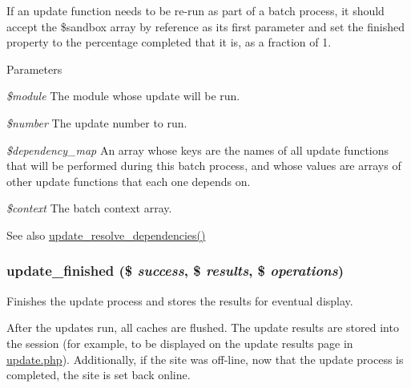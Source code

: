 If an update function needs to be re-\/run as part of a batch process, it should accept the \$sandbox array by reference as its first parameter and set the finished property to the percentage completed that it is, as a fraction of 1.


\begin{DoxyParams}{Parameters}
\item[{\em \$module}]The module whose update will be run. \item[{\em \$number}]The update number to run. \item[{\em \$dependency\_\-map}]An array whose keys are the names of all update functions that will be performed during this batch process, and whose values are arrays of other update functions that each one depends on. \item[{\em \$context}]The batch context array.\end{DoxyParams}
\begin{DoxySeeAlso}{See also}
\hyperlink{update_8inc_aa931d6cdddc2e9e0ec96d240523056e9}{update\_\-resolve\_\-dependencies()} 
\end{DoxySeeAlso}
\hypertarget{update_8inc_a80f7fdd8ca66ebda4959b9429fc343f3}{
\subsubsection[{update\_\-finished}]{\setlength{\rightskip}{0pt plus 5cm}update\_\-finished (\$ {\em success}, \/  \$ {\em results}, \/  \$ {\em operations})}}
\label{update_8inc_a80f7fdd8ca66ebda4959b9429fc343f3}
Finishes the update process and stores the results for eventual display.

After the updates run, all caches are flushed. The update results are stored into the session (for example, to be displayed on the update results page in \hyperlink{update_8php}{update.php}). Additionally, if the site was off-\/line, now that the update process is completed, the site is set back online.


